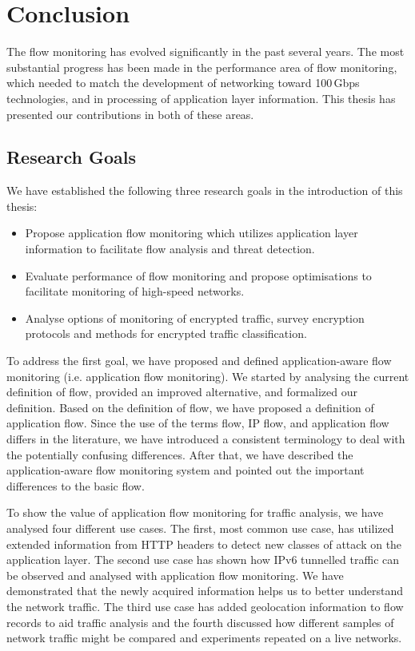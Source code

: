 \chapter{Conclusion}\label{chap:conclusions}

The flow monitoring has evolved significantly in the past several years. The most substantial progress has been made in the performance  area of flow monitoring, which needed to match the development of networking toward 100\,Gbps technologies, and in processing of application layer information. This thesis has presented our contributions in both of these areas. 

\section{Research Goals}

We have established the following three research goals in the introduction of this thesis:
\begin{itemize}
  \item Propose application flow monitoring which utilizes application layer information to facilitate flow analysis and threat detection.
  \item Evaluate performance of flow monitoring and propose optimisations to facilitate monitoring of high-speed networks.
  \item Analyse options of monitoring of encrypted traffic, survey encryption protocols and methods for encrypted traffic classification.
\end{itemize}

To address the first goal, we have proposed and defined application-aware flow monitoring (i.e. application flow monitoring). We started by analysing the current definition of flow, provided an improved alternative, and formalized our definition. Based on the definition of flow, we have proposed a definition of application flow. Since the use of the terms flow, IP flow, and application flow differs in the literature, we have introduced a consistent terminology to deal with the potentially confusing differences. After that, we have described the application-aware flow monitoring system and pointed out the important differences to the basic flow. 

To show the value of application flow monitoring for traffic analysis, we have analysed four different use cases. The first, most common use case, has utilized extended information from HTTP headers to detect new classes of attack on the application layer. The second use case has shown how IPv6 tunnelled traffic can be observed and analysed with application flow monitoring. We have demonstrated that the newly acquired information helps us to better understand the network traffic. The third use case has added geolocation information to flow records to aid traffic analysis and the fourth discussed how different samples of network traffic might be compared and experiments repeated on a live networks.

